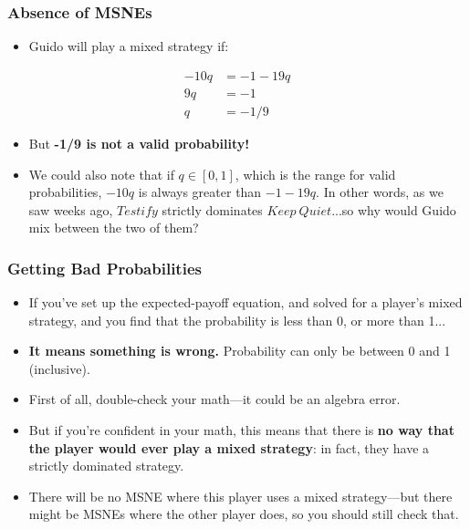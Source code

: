 \begin{frame}
\frametitle{Absence of MSNEs}
\begin{itemize}
\item Guido will play a mixed strategy if:
\end{itemize}
\begin{align*}
-10q &= -1 - 19q\\
9q &= -1\\
q &= -1/9
\end{align*}
\begin{itemize}
  \item But \textbf{-1/9 is not a valid probability!}
\item We could also note that if $q\in [0, 1]$, which is the range for valid probabilities, $-10q$ is always greater than $-1 - 19q$. In other words, as we saw weeks ago, $Testify$ strictly dominates $Keep~Quiet$...so why would Guido mix between the two of them?
\end{itemize}
\end{frame}

\begin{frame}
\frametitle{Getting Bad Probabilities}
\begin{itemize}
	\item If you've set up the expected-payoff equation, and solved for a player's mixed strategy, and you find that the probability is less than 0, or more than 1...
	\item \textbf{It means something is wrong.} Probability can only be between 0 and 1 (inclusive).
	\item First of all, double-check your math---it could be an algebra error.
	\item But if you're confident in your math, this means that there is \textbf{no way that the player would ever play a mixed strategy}: in fact, they have a strictly dominated strategy.
	\item There will be no MSNE where this player uses a mixed strategy---but there might be MSNEs where the other player does, so you should still check that.
\end{itemize}
\end{frame}

